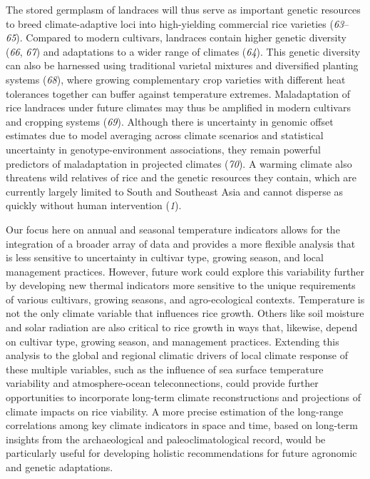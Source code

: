 \documentclass[
  letterpaper,
  DIV=11,
  numbers=noendperiod]{scrartcl}
\begin{document}
The stored germplasm of landraces will thus serve as important genetic
resources to breed climate-adaptive loci into high-yielding commercial
rice varieties (\emph{63}--\emph{65}). Compared to modern cultivars,
landraces contain higher genetic diversity (\emph{66}, \emph{67}) and
adaptations to a wider range of climates (\emph{64}). This genetic
diversity can also be harnessed using traditional varietal mixtures and
diversified planting systems (\emph{68}), where growing complementary
crop varieties with different heat tolerances together can buffer
against temperature extremes. Maladaptation of rice landraces under
future climates may thus be amplified in modern cultivars and cropping
systems (\emph{69}). Although there is uncertainty in genomic offset
estimates due to model averaging across climate scenarios and
statistical uncertainty in genotype-environment associations, they
remain powerful predictors of maladaptation in projected climates
(\emph{70}). A warming climate also threatens wild relatives of rice and
the genetic resources they contain, which are currently largely limited
to South and Southeast Asia and cannot disperse as quickly without human
intervention (\emph{1}).

Our focus here on annual and seasonal temperature indicators allows for
the integration of a broader array of data and provides a more flexible
analysis that is less sensitive to uncertainty in cultivar type, growing
season, and local management practices. However, future work could
explore this variability further by developing new thermal indicators
more sensitive to the unique requirements of various cultivars, growing
seasons, and agro-ecological contexts. Temperature is not the only
climate variable that influences rice growth. Others like soil moisture
and solar radiation are also critical to rice growth in ways that,
likewise, depend on cultivar type, growing season, and management
practices. Extending this analysis to the global and regional climatic
drivers of local climate response of these multiple variables, such as
the influence of sea surface temperature variability and
atmosphere-ocean teleconnections, could provide further opportunities to
incorporate long-term climate reconstructions and projections of climate
impacts on rice viability. A more precise estimation of the long-range
correlations among key climate indicators in space and time, based on
long-term insights from the archaeological and paleoclimatological
record, would be particularly useful for developing holistic
recommendations for future agronomic and genetic adaptations.
\end{document}

